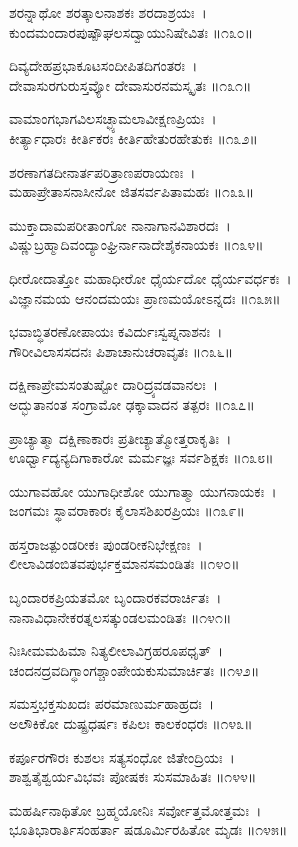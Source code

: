 	ಶರನ್ನಾಥೋ ಶರತ್ಕಾಲನಾಶಕಃ ಶರದಾಶ್ರಯಃ~।\\
	ಕುಂದಮಂದಾರಪುಷ್ಪೌಘಲಸದ್ವಾಯುನಿಷೇವಿತಃ ॥೧೩೦॥

ದಿವ್ಯದೇಹಪ್ರಭಾಕೂಟಸಂದೀಪಿತದಿಗಂತರಃ~।\\
ದೇವಾಸುರಗುರುಸ್ತವ್ಯೋ ದೇವಾಸುರನಮಸ್ಕೃತಃ ॥೧೩೧॥

	ವಾಮಾಂಗಭಾಗವಿಲಸಚ್ಛ್ಯಾಮಲಾವೀಕ್ಷಣಪ್ರಿಯಃ~।\\
	ಕೀರ್ತ್ಯಾಧಾರಃ ಕೀರ್ತಿಕರಃ ಕೀರ್ತಿಹೇತುರಹೇತುಕಃ ॥೧೩೨॥

ಶರಣಾಗತದೀನಾರ್ತಪರಿತ್ರಾಣಪರಾಯಣಃ~।\\
ಮಹಾಪ್ರೇತಾಸನಾಸೀನೋ ಜಿತಸರ್ವಪಿತಾಮಹಃ ॥೧೩೩॥

	ಮುಕ್ತಾದಾಮಪರೀತಾಂಗೋ ನಾನಾಗಾನವಿಶಾರದಃ~।\\
	ವಿಷ್ಣುಬ್ರಹ್ಮಾದಿವಂದ್ಯಾಂಘ್ರಿರ್ನಾನಾದೇಶೈಕನಾಯಕಃ ॥೧೩೪॥

ಧೀರೋದಾತ್ತೋ ಮಹಾಧೀರೋ ಧೈರ್ಯದೋ ಧೈರ್ಯವರ್ಧಕಃ~।\\
ವಿಜ್ಞಾನಮಯ ಆನಂದಮಯಃ ಪ್ರಾಣಮಯೋಽನ್ನದಃ ॥೧೩೫॥

	ಭವಾಬ್ಧಿತರಣೋಪಾಯಃ ಕವಿರ್ದುಃಸ್ವಪ್ನನಾಶನಃ~।\\
	ಗೌರೀವಿಲಾಸಸದನಃ ಪಿಶಾಚಾನುಚರಾವೃತಃ ॥೧೩೬॥

ದಕ್ಷಿಣಾಪ್ರೇಮಸಂತುಷ್ಟೋ ದಾರಿದ್ರ್ಯವಡವಾನಲಃ~।\\
ಅದ್ಭುತಾನಂತ ಸಂಗ್ರಾಮೋ ಢಕ್ಕಾವಾದನ ತತ್ಪರಃ ॥೧೩೭॥

	ಪ್ರಾಚ್ಯಾತ್ಮಾ ದಕ್ಷಿಣಾಕಾರಃ ಪ್ರತೀಚ್ಯಾತ್ಮೋತ್ತರಾಕೃತಿಃ~।\\
	ಊರ್ಧ್ವಾದ್ಯನ್ಯದಿಗಾಕಾರೋ ಮರ್ಮಜ್ಞಃ ಸರ್ವಶಿಕ್ಷಕಃ ॥೧೩೮॥

ಯುಗಾವಹೋ ಯುಗಾಧೀಶೋ ಯುಗಾತ್ಮಾ ಯುಗನಾಯಕಃ~।\\
ಜಂಗಮಃ ಸ್ಥಾವರಾಕಾರಃ ಕೈಲಾಸಶಿಖರಪ್ರಿಯಃ ॥೧೩೯॥

	ಹಸ್ತರಾಜತ್ಪುಂಡರೀಕಃ ಪುಂಡರೀಕನಿಭೇಕ್ಷಣಃ~।\\
	ಲೀಲಾವಿಡಂಬಿತವಪುರ್ಭಕ್ತಮಾನಸಮಂಡಿತಃ ॥೧೪೦॥

ಬೃಂದಾರಕಪ್ರಿಯತಮೋ ಬೃಂದಾರಕವರಾರ್ಚಿತಃ~।\\
ನಾನಾವಿಧಾನೇಕರತ್ನಲಸತ್ಕುಂಡಲಮಂಡಿತಃ ॥೧೪೧॥

	ನಿಃಸೀಮಮಹಿಮಾ ನಿತ್ಯಲೀಲಾವಿಗ್ರಹರೂಪಧೃತ್~।\\
	ಚಂದನದ್ರವದಿಗ್ಧಾಂಗಶ್ಚಾಂಪೇಯಕುಸುಮಾರ್ಚಿತಃ ॥೧೪೨॥

ಸಮಸ್ತಭಕ್ತಸುಖದಃ ಪರಮಾಣುರ್ಮಹಾಹ್ರದಃ~।\\
ಅಲೌಕಿಕೋ ದುಷ್ಪ್ರಧರ್ಷಃ ಕಪಿಲಃ ಕಾಲಕಂಧರಃ ॥೧೪೩॥

	ಕರ್ಪೂರಗೌರಃ ಕುಶಲಃ ಸತ್ಯಸಂಧೋ ಜಿತೇಂದ್ರಿಯಃ~।\\
	ಶಾಶ್ವತೈಶ್ವರ್ಯವಿಭವಃ ಪೋಷಕಃ ಸುಸಮಾಹಿತಃ ॥೧೪೪॥

ಮಹರ್ಷಿನಾಥಿತೋ ಬ್ರಹ್ಮಯೋನಿಃ ಸರ್ವೋತ್ತಮೋತ್ತಮಃ~।\\
ಭೂತಿಭಾರಾರ್ತಿಸಂಹರ್ತಾ ಷಡೂರ್ಮಿರಹಿತೋ ಮೃಡಃ ॥೧೪೫॥


